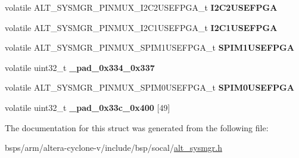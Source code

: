 \begin{DoxyCompactItemize}
\item 
\mbox{\label{structALT__SYSMGR__PINMUX__s_afe63d2f58cbf81cb0fc0a0f46d6b19e2}} 
volatile A\+L\+T\+\_\+\+S\+Y\+S\+M\+G\+R\+\_\+\+P\+I\+N\+M\+U\+X\+\_\+\+I2\+C2\+U\+S\+E\+F\+P\+G\+A\+\_\+t {\bfseries I2\+C2\+U\+S\+E\+F\+P\+GA}
\item 
\mbox{\label{structALT__SYSMGR__PINMUX__s_ae46c44421016a9091efeb96b1dd7eca0}} 
volatile A\+L\+T\+\_\+\+S\+Y\+S\+M\+G\+R\+\_\+\+P\+I\+N\+M\+U\+X\+\_\+\+I2\+C1\+U\+S\+E\+F\+P\+G\+A\+\_\+t {\bfseries I2\+C1\+U\+S\+E\+F\+P\+GA}
\item 
\mbox{\label{structALT__SYSMGR__PINMUX__s_aa6a0fd4c84721f907a24f126cf304234}} 
volatile A\+L\+T\+\_\+\+S\+Y\+S\+M\+G\+R\+\_\+\+P\+I\+N\+M\+U\+X\+\_\+\+S\+P\+I\+M1\+U\+S\+E\+F\+P\+G\+A\+\_\+t {\bfseries S\+P\+I\+M1\+U\+S\+E\+F\+P\+GA}
\item 
\mbox{\label{structALT__SYSMGR__PINMUX__s_a420d8f6daeda862e0e26b1385c80c426}} 
volatile uint32\+\_\+t {\bfseries \+\_\+pad\+\_\+0x334\+\_\+0x337}
\item 
\mbox{\label{structALT__SYSMGR__PINMUX__s_a563da06c5f35746d869f815076719988}} 
volatile A\+L\+T\+\_\+\+S\+Y\+S\+M\+G\+R\+\_\+\+P\+I\+N\+M\+U\+X\+\_\+\+S\+P\+I\+M0\+U\+S\+E\+F\+P\+G\+A\+\_\+t {\bfseries S\+P\+I\+M0\+U\+S\+E\+F\+P\+GA}
\item 
\mbox{\label{structALT__SYSMGR__PINMUX__s_acbfaf9f7b56df7d6afbf9e0691911dea}} 
volatile uint32\+\_\+t {\bfseries \+\_\+pad\+\_\+0x33c\+\_\+0x400} \mbox{[}49\mbox{]}
\end{DoxyCompactItemize}


The documentation for this struct was generated from the following file\+:\begin{DoxyCompactItemize}
\item 
bsps/arm/altera-\/cyclone-\/v/include/bsp/socal/\mbox{\hyperlink{alt__sysmgr_8h}{alt\+\_\+sysmgr.\+h}}\end{DoxyCompactItemize}
